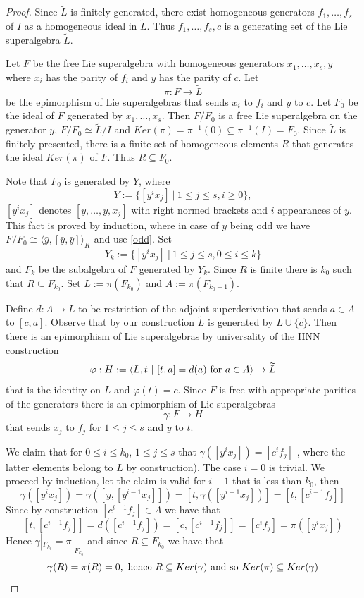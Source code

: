 \documentclass[12pt, reqno]{amsart}
\theoremstyle{remark}
\theoremstyle{definition}
\numberwithin{equation}{section}
\begin{document}
 \begin{proof} 
 Since $\widetilde L$ is finitely generated, there exist homogeneous generators $f_1, \ldots, f_s$ 
 of $I$ as a homogeneous ideal in $\widetilde{L}$. Thus $f_1, \ldots, f_s, c$ is a generating set of the Lie superalgebra  $\widetilde{L}$. 
 
 Let $F$ be the free Lie superalgebra with homogeneous generators $x_1, \ldots, x_s, y$ where $x_i$ has the parity of $f_i$ and $y$ has the parity of $c$.
  Let $$\pi : F \to \widetilde{L}$$ be the epimorphism of Lie superalgebras that sends $x_i$ to $f_i$ and $y$ to $c$.
Let $F_0$ be the ideal of $F$ generated by $x_1, \ldots, x_s$. Then $F/ F_0$ is a free Lie superalgebra on the generator $y$, $F/ F_0 \simeq \widetilde{L} / I$ and $Ker (\pi) = \pi^{-1} (0) \subseteq \pi^{-1} (I) = F_0$.
Since $\widetilde{L}$ is finitely presented, there is a finite set of homogeneous elements $R$ that generates the ideal $Ker (\pi)$ of $F$. Thus $R \subseteq F_0$.

Note that $F_0$ is generated by $Y$, where  
$$Y  := \{ [y^i x_j]\  | \ 1 \leq j \leq s, i \geq 0 \},$$  $[y^i x_j]$ denotes $[y, \ldots, y, x_j]$ 
with right normed brackets and $i$ appearances of $y$. 
This fact is proved by induction, where in case of $y$ being odd 
we have $F/F_0\cong \langle \bar y, [\bar y,\bar y]\rangle_K$ and use \eqref{odd}.
Set 
$$Y_k  := \{ [y^i x_j]\ { |} \  1 \leq j \leq s, 0 \leq  i \leq k \}$$ and $F_k$ be the  
subalgebra of $F$ generated by $Y_k$. Since $R$ is finite there is $k_0$ such that $R \subseteq { F_{k_0}}$.
Set $L := \pi(F_{k_0 })$ and $A := \pi (F_{k_0-1})$.

Define $d : A \to L$ to be  
restriction of the adjoint superderivation
that sends $a \in A$ to $[c,a]$. 
Observe that by our construction $\widetilde L$ is generated by $L\cup\{c\}$.
Then there is an epimorphism of Lie superalgebras 
by universality of the HNN construction
$$\varphi : H  := \langle L, t \ | \ [t,a] = d(a) \hbox{ for } a \in A \rangle \to \widetilde{L}$$
that is the identity on $L$ and $\varphi(t) = c$.  
Since $F$ is free with appropriate parities of the generators
there is an epimorphism of Lie superalgebras $$\gamma : F \to H$$  that sends $x_j$ to $f_j$ for $ 1 \leq j \leq s$ and $y$ to $t$.

We claim that for $ 0\le  i \leq k_0 $, $ 1 \leq j \leq s$  that $\gamma ([y^i x_j]) = [c^i f_j]$ ,
where the latter elements belong to $L$ by construction).
The case $i=0$ is trivial. We proceed by induction, let the claim is valid for $i-1$ that is less than $k_0$, then
$$\gamma ([y^i x_j]) = \gamma([y,  [y^{i-1} x_j]  ]) = [t, \gamma (  [y^{i-1} x_j])] = [t, [c^{i-1} f_j]]$$
Since  by construction $[c^{i-1} f_j] \in A$ we have that
$$ [t, [c^{i-1} f_j]] = d( [c^{i-1} f_j]) = [c,   [c^{i-1} f_j]] = [c^i f_j] = \pi([y^i x_j])$$
Hence $\gamma |_{F_{k_0}} = \pi |_{F_{k_0}}$ and since $R \subseteq F_{k_0}$
we have that
$$\gamma(R)  = \pi(R) = 0, \hbox{ hence } R \subseteq Ker(\gamma) \hbox{ and  so } Ker (\pi) \subseteq Ker(\gamma)$$


\end{proof}
\end{document}
